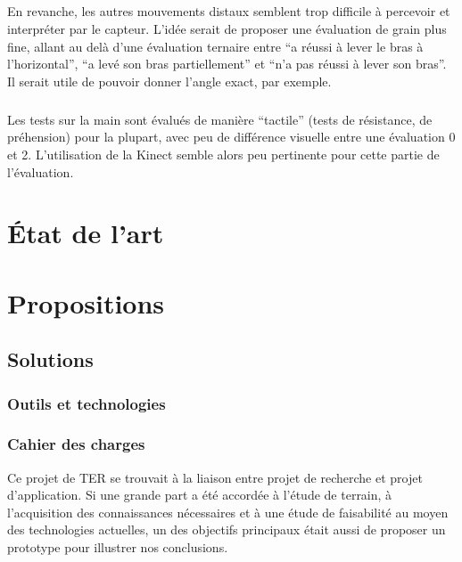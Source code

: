 \documentclass[french,12pt]{report}
\begin{document}
\paragraph{}En revanche, les autres mouvements distaux semblent trop difficile à percevoir et interpréter par le capteur.
L’idée serait de proposer une évaluation de grain plus fine, allant au delà d’une évaluation ternaire entre 
“a réussi à lever le bras à l’horizontal”, “a levé son bras partiellement” et “n’a pas réussi à lever son bras”. 
Il serait utile de pouvoir donner l’angle exact, par exemple.   

\paragraph{}Les tests sur la main sont évalués de manière “tactile” (tests de résistance, de préhension) pour la plupart, 
avec peu de différence visuelle entre une évaluation 0 et 2. L’utilisation de la Kinect semble alors peu pertinente
pour cette partie de l’évaluation.
		
	\chapter{État de l'art}
	
  
	
  
  

	
	
	\chapter{Propositions}
	
		\section{Solutions}
    \subsection{Outils et technologies} 
    
    
		\subsection{Cahier des charges}
Ce projet de TER se trouvait à la liaison entre projet de recherche et projet d'application. Si une grande part a été accordée à 
l'étude de terrain, à l'acquisition des connaissances nécessaires et à une étude de faisabilité au moyen des technologies actuelles, un des objectifs principaux était aussi de proposer un prototype pour illustrer nos conclusions.
		
\end{document}
